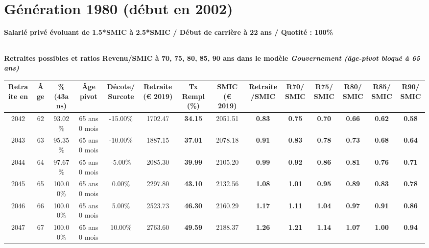 \section{Génération 1980 (début en 2002)\label{Ascendant1525_100_1980_22_0}} 
 
{\bf \noindent Salarié privé évoluant de 1.5*SMIC à 2.5*SMIC / Début de carrière à 22 ans / Quotité : 100\%}  ~ 

 ~\\{\bf \noindent Retraites possibles et ratios Revenu/SMIC à 70, 75, 80, 85, 90 ans dans le modèle \emph{Gouvernement (âge-pivot bloqué à 65 ans)}}  
 
\begin{adjustbox}{max width=\textwidth} 
\begin{tabular}[htb]{|c|c||c|c|c||c|c||c|c||c|c|c|c|c|} 
\hline 
 Retraite en &  Âge &  \%(43ans) &  Âge pivot &  Décote/Surcote &  Retraite (\euro{} 2019) &  Tx Rempl(\%) &  SMIC (\euro{} 2019) &  Retraite/SMIC &  R70/SMIC &  R75/SMIC &  R80/SMIC &  R85/SMIC &  R90/SMIC \\ 
\hline \hline 
 2042 &  62 &  93.02\% &  65 ans 0 mois &  -15.00\% &  1702.47 &  {\bf 34.15} &  2051.51 &  {\bf {\color{red} 0.83}} &  {\bf {\color{red} 0.75}} &  {\bf {\color{red} 0.70}} &  {\bf {\color{red} 0.66}} &  {\bf {\color{red} 0.62}} &  {\bf {\color{red} 0.58}} \\ 
\hline 
 2043 &  63 &  95.35\% &  65 ans 0 mois &  -10.00\% &  1887.15 &  {\bf 37.01} &  2078.18 &  {\bf {\color{red} 0.91}} &  {\bf {\color{red} 0.83}} &  {\bf {\color{red} 0.78}} &  {\bf {\color{red} 0.73}} &  {\bf {\color{red} 0.68}} &  {\bf {\color{red} 0.64}} \\ 
\hline 
 2044 &  64 &  97.67\% &  65 ans 0 mois &  -5.00\% &  2085.30 &  {\bf 39.99} &  2105.20 &  {\bf {\color{red} 0.99}} &  {\bf {\color{red} 0.92}} &  {\bf {\color{red} 0.86}} &  {\bf {\color{red} 0.81}} &  {\bf {\color{red} 0.76}} &  {\bf {\color{red} 0.71}} \\ 
\hline 
 2045 &  65 &  100.00\% &  65 ans 0 mois &  0.00\% &  2297.80 &  {\bf 43.10} &  2132.56 &  {\bf 1.08} &  {\bf 1.01} &  {\bf {\color{red} 0.95}} &  {\bf {\color{red} 0.89}} &  {\bf {\color{red} 0.83}} &  {\bf {\color{red} 0.78}} \\ 
\hline 
 2046 &  66 &  100.00\% &  65 ans 0 mois &  5.00\% &  2523.73 &  {\bf 46.30} &  2160.29 &  {\bf 1.17} &  {\bf 1.11} &  {\bf 1.04} &  {\bf {\color{red} 0.97}} &  {\bf {\color{red} 0.91}} &  {\bf {\color{red} 0.86}} \\ 
\hline 
 2047 &  67 &  100.00\% &  65 ans 0 mois &  10.00\% &  2763.60 &  {\bf 49.59} &  2188.37 &  {\bf 1.26} &  {\bf 1.21} &  {\bf 1.14} &  {\bf 1.07} &  {\bf 1.00} &  {\bf {\color{red} 0.94}} \\ 
\hline 
\hline 
\end{tabular} 
\end{adjustbox} 
 
